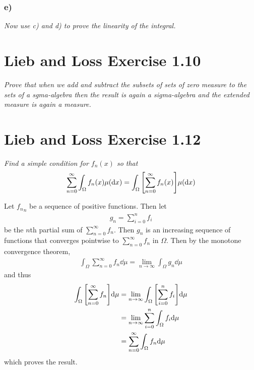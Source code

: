 \documentclass[12pt]{article}
\theoremstyle{plain}
\begin{document}
\subsubsection*{ e)}
\emph{Now use c) and d) to prove the linearity of the integral.}

\section*{Lieb and Loss Exercise 1.10}
\emph{Prove that when we add and subtract the subsets of sets of zero measure to the sets of a sgma-algebra then the result is again a sigma-algebra and the extended measure is again a measure.}

\section*{Lieb and Loss Exercise 1.12}
\emph{Find a simple condition for $f_n(x)$ so that}
\begin{align*}
    \sum_{n=0}^\infty \int_\Omega f_n(x) \mu(\dd x) = \int_\Omega \qty[\sum_{n=0}^\infty f_n(x)]\mu(\dd x)
\end{align*}

Let ${f_n}_n$ be a sequence of positive functions.  Then let
\begin{align*}
    g_n = \sum_{i = 0}^n f_i
\end{align*}
be the $n$th partial sum of $\sum_{n = 0}^\infty f_n$.  Then $g_n$ is an increasing sequence of functions that converges pointwise to $\sum_{n = 0}^\infty f_n$ in $\Omega$.  Then by the monotone convergence theorem,
\begin{align*}
    \int_\Omega \sum_{n = 0}^\infty f_n \dd \mu= \lim_{n\rightarrow \infty}\int_\Omega g_n \dd \mu
\end{align*}
and thus
\begin{align*}
    \int_\Omega \qty[\sum_{n = 0}^\infty f_n] \dd \mu &= \lim_{n\rightarrow \infty}\int_\Omega \qty[\sum_{i=0}^n f_i] \dd \mu \\
    &= \lim_{n\rightarrow \infty} \sum_{i = 0}^n \int_\Omega f_i \dd \mu \\
    &= \sum_{n = 0}^\infty \int_\Omega f_n \dd \mu
\end{align*}
which proves the result.
\end{document}
